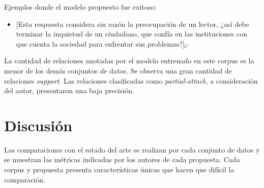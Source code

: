 \documentclass[a4paper,11pt,twocolumn,twoside]{article}
\begin{document}
Ejemplos donde el modelo propuesto fue exitoso:
\begin{itemize}
	\item \text{} [Esta respuesta considera sin razón la preocupación de un lector,
		      ¿así debe terminar la inquietud de un ciudadano, que confía en las instituciones con que cuenta la 
		      sociedad para enfrentar sus problemas?]$_C$ %
\end{itemize}

La cantidad de relaciones anotadas por el modelo entrenado en este corpus es la menor
de los demás conjuntos de datos. Se observa una gran cantidad de relaciones \textit{support}. %
Las relaciones clasificadas como \textit{partial-attack}, a consideración del autor, presentaron 
una baja precisión.


\section{Discusión}


Las comparaciones con el estado del arte se realizan por cada conjunto de datos y se muestran las 
métricas indicadas por los autores de cada propuesta. Cada corpus y propuesta 
presenta características únicas que hacen que difícil la comparación. 
\end{document}
